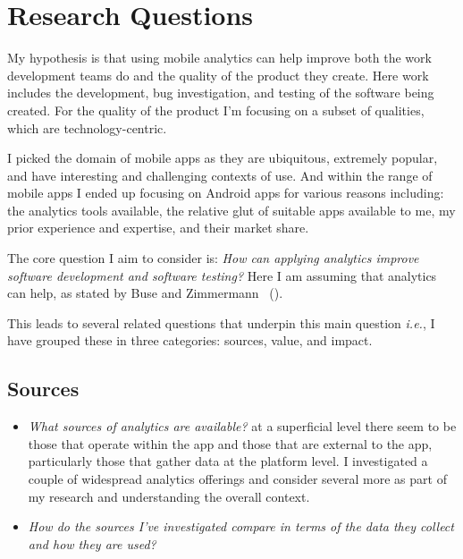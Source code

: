 \section{Research Questions}
My hypothesis is that using mobile analytics can help improve both the work development teams do and the quality of the product they create. Here work includes the development, bug investigation, and testing of the software being created. For the quality of the product I'm focusing on a subset of qualities, which are technology-centric.

I picked the domain of mobile apps as they are ubiquitous, extremely popular, and have interesting and challenging contexts of use. And within the range of mobile apps I ended up focusing on Android apps for various reasons including: the analytics tools available, the relative glut of suitable apps available to me, my prior experience and expertise, and their market share.

The core question I aim to consider is: 
\emph{How can applying analytics improve software development and software testing?} Here I am assuming that analytics can help, as stated by Buse and Zimmermann ~(\citeyear{buse_analytics_2010}).

This leads to several related questions that underpin this main question \emph{i.e.}, I have grouped these in three categories: sources, value, and impact.


\subsection{Sources}
\begin{itemize}
    \item \emph{What sources of analytics are available?} at a superficial level there seem to be those that operate within the app and those that are external to the app, particularly those that gather data at the platform level. I investigated a couple of widespread analytics offerings and consider several more as part of my research and understanding the overall context.
    \item \emph{How do the sources I've investigated compare in terms of the data they collect and how they are used?}
\end{itemize}

